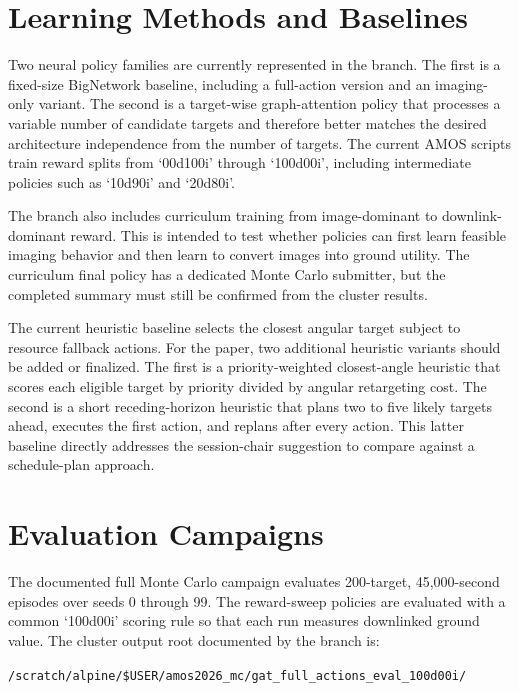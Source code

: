 \documentclass{amos}
\begin{document}
\section{Learning Methods and Baselines}

Two neural policy families are currently represented in the branch. The first is a fixed-size BigNetwork baseline, including a full-action version and an imaging-only variant. The second is a target-wise graph-attention policy that processes a variable number of candidate targets and therefore better matches the desired architecture independence from the number of targets. The current AMOS scripts train reward splits from `00d100i' through `100d00i', including intermediate policies such as `10d90i' and `20d80i'.

The branch also includes curriculum training from image-dominant to downlink-dominant reward. This is intended to test whether policies can first learn feasible imaging behavior and then learn to convert images into ground utility. The curriculum final policy has a dedicated Monte Carlo submitter, but the completed summary must still be confirmed from the cluster results.

The current heuristic baseline selects the closest angular target subject to resource fallback actions. For the paper, two additional heuristic variants should be added or finalized. The first is a priority-weighted closest-angle heuristic that scores each eligible target by priority divided by angular retargeting cost. The second is a short receding-horizon heuristic that plans two to five likely targets ahead, executes the first action, and replans after every action. This latter baseline directly addresses the session-chair suggestion to compare against a schedule-plan approach.

\section{Evaluation Campaigns}

The documented full Monte Carlo campaign evaluates 200-target, 45,000-second episodes over seeds 0 through 99. The reward-sweep policies are evaluated with a common `100d00i' scoring rule so that each run measures downlinked ground value. The cluster output root documented by the branch is:

\begin{center}
\texttt{/scratch/alpine/\$USER/amos2026\_mc/gat\_full\_actions\_eval\_100d00i/}
\end{center}
\end{document}
